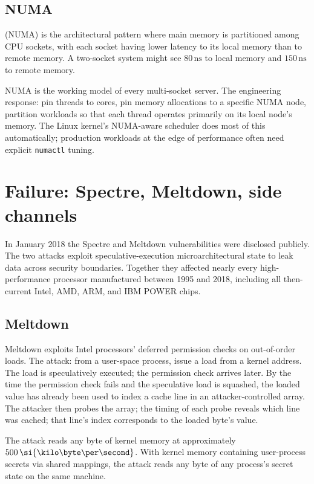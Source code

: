 \subsection{NUMA}

 (NUMA) is the architectural pattern where main memory is partitioned among CPU sockets, with each socket having lower latency to its local memory than to remote memory. A two-socket system might see $80\,\si{\nano\second}$ to local memory and $150\,\si{\nano\second}$ to remote memory.

NUMA is the working model of every multi-socket server. The engineering response: pin threads to cores, pin memory allocations to a specific NUMA node, partition workloads so that each thread operates primarily on its local node's memory. The Linux kernel's NUMA-aware scheduler does most of this automatically; production workloads at the edge of performance often need explicit \texttt{numactl} tuning.

\section{Failure: Spectre, Meltdown, side channels}

In January 2018 the Spectre and Meltdown vulnerabilities were disclosed publicly. The two attacks exploit speculative-execution microarchitectural state to leak data across security boundaries. Together they affected nearly every high-performance processor manufactured between 1995 and 2018, including all then-current Intel, AMD, ARM, and IBM POWER chips.

\subsection{Meltdown}

Meltdown \cite{paper:lipp-meltdown-2018} exploits Intel processors' deferred permission checks on out-of-order loads. The attack: from a user-space process, issue a load from a kernel address. The load is speculatively executed; the permission check arrives later. By the time the permission check fails and the speculative load is squashed, the loaded value has already been used to index a cache line in an attacker-controlled array. The attacker then probes the array; the timing of each probe reveals which line was cached; that line's index corresponds to the loaded byte's value.

The attack reads any byte of kernel memory at approximately $500\,\si{\kilo\byte\per\second}$. With kernel memory containing user-process secrets via shared mappings, the attack reads any byte of any process's secret state on the same machine.


